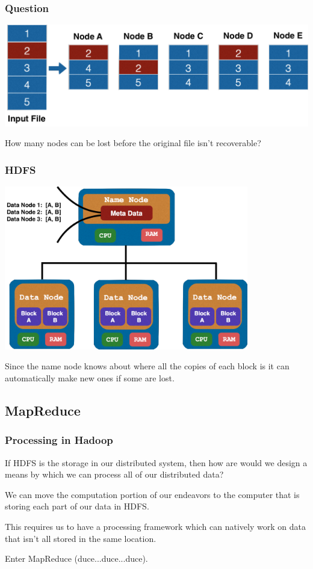 \documentclass{beamer}
\begin{document}
\begin{frame}
  \frametitle{Question}
  \includegraphics[width=\textwidth]{../images/replication.png}
  \begin{block}{}
    How many nodes can be lost before the original file isn't recoverable?
  \end{block}
\end{frame}

\begin{frame}
  \frametitle{HDFS}
  \centering
  \includegraphics[width=0.8\textwidth]{../images/name_node.png}

  \vspace{4mm}
  \parbox{\linewidth}{Since the name node knows about where all the copies of each block is it can automatically make new ones if some are lost.}
\end{frame}

\subsection{MapReduce}
\begin{frame}
  \frametitle{Processing in Hadoop}
  If HDFS is the storage in our distributed system, then how are would we design a means by which we can process all of our distributed data? \pause
  \vspace{4mm}
  \begin{block}{}
    We can move the computation portion of our endeavors to the computer that is storing each part of our data in HDFS.
  \end{block} \pause
  \vspace{4mm}
  This requires us to have a processing framework which can natively work on data that isn't all stored in the same location. 

  \vspace{4mm}
  \centering   
  Enter \alert{\LARGE MapReduce} ({\LARGE duce...}{\large duce...}{\small duce}).
\end{frame}
\end{document}
